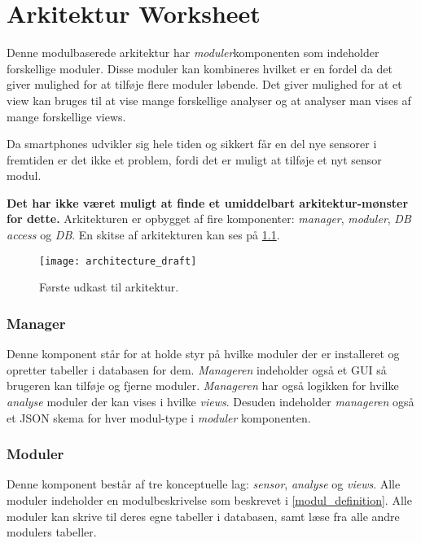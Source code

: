 \chapter{Arkitektur Worksheet}
Denne modulbaserede arkitektur har \textit{moduler}komponenten som indeholder forskellige moduler.
Disse moduler kan kombineres hvilket er en fordel da det giver mulighed for at tilføje flere moduler løbende.
Det giver mulighed for at et view kan bruges til at vise mange forskellige analyser og at analyser man vises af mange forskellige views.

Da smartphones udvikler sig hele tiden og sikkert får en del nye sensorer i fremtiden er det ikke et problem, fordi det er muligt at tilføje et nyt sensor modul.

\textbf{Det har ikke været muligt at finde et umiddelbart arkitektur-mønster for dette.}
Arkitekturen er opbygget af fire komponenter: \textit{manager}, \textit{moduler}, \textit{DB access} og \textit{DB}.
En skitse af arkitekturen kan ses på \cref{arkitektur_udkast_1}.
\begin{figure}[h]
	\texttt{[image: architecture\_draft]}
	\caption{Første udkast til arkitektur.}
  \label{arkitektur_udkast_1}
\end{figure}

\subsection*{Manager}
Denne komponent står for at holde styr på hvilke moduler der er installeret og opretter tabeller i databasen for dem.
\textit{Manageren} indeholder også et GUI så brugeren kan tilføje og fjerne moduler.
\textit{Manageren} har også logikken for hvilke \textit{analyse} moduler der kan vises i hvilke \textit{views}.
Desuden indeholder \textit{manageren} også et JSON skema for hver modul-type i \textit{moduler} komponenten.

\subsection*{Moduler}
Denne komponent består af tre konceptuelle lag: \textit{sensor}, \textit{analyse} og \textit{views}.
Alle moduler indeholder en modulbeskrivelse som beskrevet i \cref{modul_definition}. 
Alle moduler kan skrive til deres egne tabeller i databasen, samt læse fra alle andre modulers tabeller.

